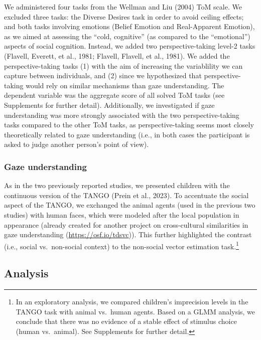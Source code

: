 \documentclass[
  man,mask,floatsintext]{apa6}
\begin{document}
We administered four tasks from the Wellman and Liu (2004) ToM scale. We excluded three tasks: the Diverse Desires task in order to avoid ceiling effects; and both tasks involving emotions (Belief Emotion and Real-Apparent Emotion), as we aimed at assessing the ``cold, cognitive'' (as compared to the ``emotional'') aspects of social cognition. Instead, we added two perspective-taking level-2 tasks (Flavell, Everett, et al., 1981; Flavell, Flavell, et al., 1981). We added the perspective-taking tasks (1) with the aim of increasing the variablility we can capture between individuals, and (2) since we hypothesized that perspective-taking would rely on similar mechanisms than gaze understanding. The dependent variable was the aggregate score of all solved ToM tasks (see Supplements for further detail). Additionally, we investigated if gaze understanding was more strongly associated with the two perspective-taking tasks compared to the other ToM tasks, as perspective-taking seems most closely theoretically related to gaze understanding (i.e., in both cases the participant is asked to judge another person's point of view).

\hypertarget{gaze-understanding}{%
\subsubsection{Gaze understanding}\label{gaze-understanding}}

As in the two previously reported studies, we presented children with the continuous version of the TANGO (Prein et al., 2023). To accentuate the social aspect of the TANGO, we exchanged the animal agents (used in the previous two studies) with human faces, which were modeled after the local population in appearance (already created for another project on cross-cultural similarities in gaze understanding (\url{https://osf.io/tdsvc})). This further highlighted the contrast (i.e., social vs.~non-social context) to the non-social vector estimation task.\footnote{In an exploratory analysis, we compared children's imprecision levels in the TANGO task with animal vs.~human agents. Based on a GLMM analysis, we conclude that there was no evidence of a stable effect of stimulus choice (human vs.~animal). See Supplements for further detail.}

\hypertarget{analysis-2}{%
\subsection{Analysis}\label{analysis-2}}
\end{document}
